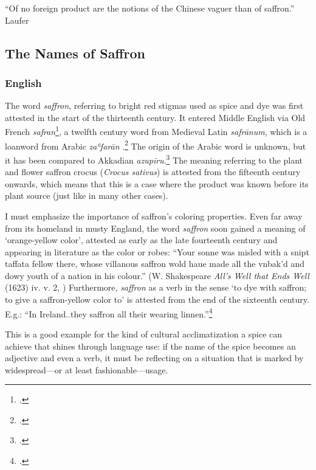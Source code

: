 ``Of no foreign product are the notions of the Chinese vaguer than
of saffron.'' Laufer

\subsection{The Names of Saffron}
\label{sec:names_of_saffron}

\subsubsection{English}



The word \textit{saffron}, referring to  bright red stigmas used as spice and dye was first attested in the start of the thirteenth century. It entered Middle English via Old French \textit{safran}\footcite[safran ]{tlfi}, a twelfth century word from Medieval Latin \textit{safrānum}, which is a loanword from Arabic \textit{zaʿfarān} .\footcites[saffron]{oed}[saf(f)rǒun]{med} The origin of the Arabic word is unknown, but it has been compared to Akkadian \textit{azupīru}.\footcite[saffron ]{ahd} The meaning referring to the plant and flower saffron crocus (\textit{Crocus sativus}) is attested from the fifteenth century onwards, which means that this is a case where the product was known before its plant source (just like in many other cases).

I must emphasize the importance of saffron's coloring properties. Even far away from its homeland in musty England, the word \textit{saffron} soon gained a meaning of `orange-yellow color', attested as early as the late fourteenth century and appearing in literature as the color or robes: ``Your sonne was misled with a snipt taffata fellow there, whose villanous saffron wold haue made all the vnbak'd and dowy youth of a nation in his colour.'' (W. Shakespeare \textit{All's Well that Ends Well} (1623) iv. v. 2, \cite[saffron]{oed}) Furthermore, \textit{saffron} as a verb in the sense `to dye with saffron; to give a saffron-yellow color to' is attested from the end of the sixteenth century. E.g.: ``In Ireland..they saffron all their wearing linnen.''\footcite[saffron, v.]{oed}

This is a good example for the kind of cultural acclimatization a spice can achieve that shines through language use: if the name of the spice becomes an adjective and even a verb, it must be reflecting on a situation that is marked by widespread---or at least fashionable---usage.

